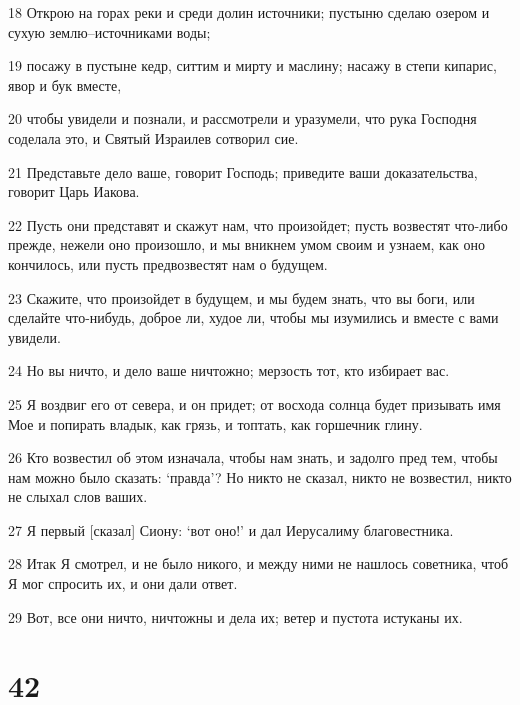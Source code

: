 \par 18 Открою на горах реки и среди долин источники; пустыню сделаю озером и сухую землю--источниками воды;
\par 19 посажу в пустыне кедр, ситтим и мирту и маслину; насажу в степи кипарис, явор и бук вместе,
\par 20 чтобы увидели и познали, и рассмотрели и уразумели, что рука Господня соделала это, и Святый Израилев сотворил сие.
\par 21 Представьте дело ваше, говорит Господь; приведите ваши доказательства, говорит Царь Иакова.
\par 22 Пусть они представят и скажут нам, что произойдет; пусть возвестят что-либо прежде, нежели оно произошло, и мы вникнем умом своим и узнаем, как оно кончилось, или пусть предвозвестят нам о будущем.
\par 23 Скажите, что произойдет в будущем, и мы будем знать, что вы боги, или сделайте что-нибудь, доброе ли, худое ли, чтобы мы изумились и вместе с вами увидели.
\par 24 Но вы ничто, и дело ваше ничтожно; мерзость тот, кто избирает вас.
\par 25 Я воздвиг его от севера, и он придет; от восхода солнца будет призывать имя Мое и попирать владык, как грязь, и топтать, как горшечник глину.
\par 26 Кто возвестил об этом изначала, чтобы нам знать, и задолго пред тем, чтобы нам можно было сказать: `правда'? Но никто не сказал, никто не возвестил, никто не слыхал слов ваших.
\par 27 Я первый [сказал] Сиону: `вот оно!' и дал Иерусалиму благовестника.
\par 28 Итак Я смотрел, и не было никого, и между ними не нашлось советника, чтоб Я мог спросить их, и они дали ответ.
\par 29 Вот, все они ничто, ничтожны и дела их; ветер и пустота истуканы их.

\chapter{42}

